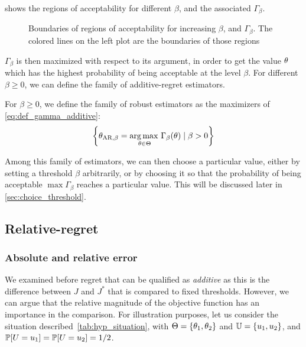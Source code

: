 \documentclass[../../Main_ManuscritThese.tex]{subfiles}
\newcommand\imgpath{/home/victor/acadwriting/Manuscrit/Text/Chapter3/img/}
\begin{document}
   shows the regions of acceptability for different $\beta$, and the associated $\Gamma_{\beta}$.

\begin{figure}[ht]
  \centering
  
  \caption[Regions of $\beta$-acceptability]{\label{fig:gamma_beta_increasing} Boundaries of regions of acceptability for increasing $\beta$, and $\Gamma_{\beta}$. The colored lines on the left plot are the boundaries of those regions}
\end{figure}


  $\Gamma_{\beta}$ is then maximized with respect to its argument, in order to get the value $\theta$ which has the highest probability of being acceptable at the level $\beta$. For different $\beta \geq 0$, we can define the family of additive-regret  estimators.

  
  \begin{definition}
    For $\beta \geq 0$, we define the family of robust estimators as the maximizers of \cref{eq:def_gamma_additive}:
    \begin{equation}
      \left\{\estimtxt{\kk}{AR,\beta} = \argmax_{\kk\in\Kspace} \Gamma_{\beta}(\kk) \mid \beta > 0\right\} %
    \end{equation}
  \end{definition}
  Among this family of estimators, we can then choose a particular value, either by setting a threshold $\beta$ arbitrarily, or by choosing it so that the probability of being acceptable $\max \Gamma_{\beta}$ reaches a particular value. This will be discussed later in \cref{sec:choice_threshold}.


  \subsection{Relative-regret}
  \subsubsection{Absolute and relative error}
  \label{ssec:hyp_situation}
We examined before regret that can be qualified as \emph{additive} as this is the difference between $J$ and $J^*$ that is compared to fixed thresholds.
However, we can argue that the relative magnitude of the objective function has an importance in the comparison. For illustration purposes, let us consider the situation described~\cref{tab:hyp_situation}, with $\Theta = \{\theta_1, \theta_2\}$ and $\mathbb{U} = \{u_1, u_2\}$, and $\mathbb{P}[U = u_1] =\mathbb{P}[U = u_2]= 1/2$.
\end{document}
